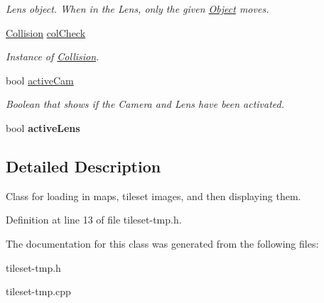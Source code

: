 \begin{DoxyCompactItemize}
\begin{DoxyCompactList}\small\item\em Lens object. When in the Lens, only the given \hyperlink{classObject}{Object} moves. \end{DoxyCompactList}\item 
\hyperlink{classCollision}{Collision} \hyperlink{classTileset_a16c70ebbbd2ed213f4485b953f65ce3a}{col\+Check}\hypertarget{classTileset_a16c70ebbbd2ed213f4485b953f65ce3a}{}\label{classTileset_a16c70ebbbd2ed213f4485b953f65ce3a}

\begin{DoxyCompactList}\small\item\em Instance of \hyperlink{classCollision}{Collision}. \end{DoxyCompactList}\item 
bool \hyperlink{classTileset_ac7dd26d0c9f4e14b0e8d03d48359a90e}{active\+Cam}\hypertarget{classTileset_ac7dd26d0c9f4e14b0e8d03d48359a90e}{}\label{classTileset_ac7dd26d0c9f4e14b0e8d03d48359a90e}

\begin{DoxyCompactList}\small\item\em Boolean that shows if the Camera and Lens have been activated. \end{DoxyCompactList}\item 
bool {\bfseries active\+Lens}\hypertarget{classTileset_a49bf1c831399e566e2661029f9d24bd1}{}\label{classTileset_a49bf1c831399e566e2661029f9d24bd1}

\end{DoxyCompactItemize}


\subsection{Detailed Description}
Class for loading in maps, tileset images, and then displaying them. 

Definition at line 13 of file tileset-\/tmp.\+h.



The documentation for this class was generated from the following files\+:\begin{DoxyCompactItemize}
\item 
tileset-\/tmp.\+h\item 
tileset-\/tmp.\+cpp\end{DoxyCompactItemize}
